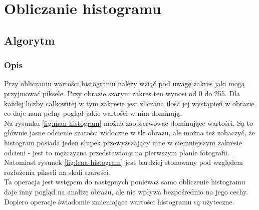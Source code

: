 \documentclass[a4paper,12pt]{book}
\begin{document}
\section{Obliczanie histogramu}
\subsection*{Algorytm}
\subsubsection*{Opis}
Przy obliczaniu wartości histogramu należy wziąć pod uwagę zakres jaki mogą przyjmować piksele. Przy obrazie szarym zakres ten wynosi od 0 do 255. Dla każdej liczby całkowitej w tym zakresie jest zliczana ilość jej wystąpień w obrazie co daje nam pełny pogląd jakie wartości w nim dominują.  \\
Na rysunku \ref{fig:man-histogram} można zaobserwować dominujące wartości. Są to głównie jasne odcienie szarości widoczne w tle obrazu, ale można też zobaczyć, że histogram posiada jeden słupek przewyższający inne w ciemniejszym zakresie odcieni - jest to mężczyzna przedstawiony na pierwszym planie fotografii. \\
Natomiast rysunek \ref{fig:lena-histogram} jest bardziej stonowany pod względem rozłożenia pikseli na skali szarości. \\
Ta operacja jest wstępem do następnych ponieważ samo obliczenie histogramu daje inny pogląd na analizę obrazu, ale nie wpływa bezpośrednio na jego cechy. Dopiero operacje świadomie zmieniające wartości histogramu są użyteczne. 
\end{document}
